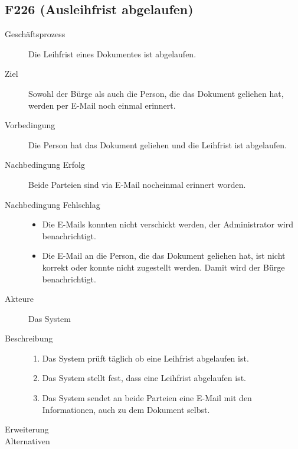 \subsection{F226 (Ausleihfrist abgelaufen)}
\begin{description}
  \item[Geschäftsprozess]Die Leihfrist eines Dokumentes ist abgelaufen.
  \item[Ziel]Sowohl der Bürge als auch die Person, die das Dokument geliehen hat, werden per E-Mail noch einmal erinnert.
  \item[Vorbedingung]Die Person hat das Dokument geliehen und die Leihfrist ist abgelaufen.
  \item[Nachbedingung Erfolg]Beide Parteien sind via E-Mail nocheinmal erinnert worden.
  \item[Nachbedingung Fehlschlag]
    \begin{itemize}
      \item Die E-Mails konnten nicht verschickt werden, der Administrator wird benachrichtigt.
      \item Die E-Mail an die Person, die das Dokument geliehen hat, ist nicht korrekt oder konnte nicht zugestellt werden. Damit wird der Bürge benachrichtigt.
    \end{itemize}
  \item[Akteure]Das System
  \item[Beschreibung]\hfill
    \begin{enumerate}
      \item Das System prüft täglich ob eine Leihfrist abgelaufen ist.
      \item Das System stellt fest, dass eine Leihfrist abgelaufen ist.
      \item Das System sendet an beide Parteien eine E-Mail mit den Informationen, auch zu dem Dokument selbst.
    
    \end{enumerate}
  \item[Erweiterung]
  \item[Alternativen]
\end{description}

